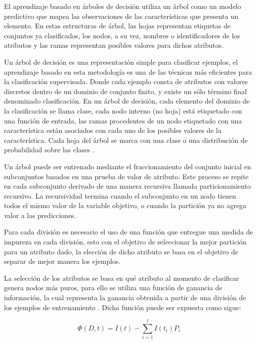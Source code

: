El aprendizaje basado en árboles de decisión utiliza un árbol como un modelo predictivo que mapea las observaciones de las características que presenta un elemento. En estas estructuras de árbol, las hojas representan etiquetas de conjuntos ya clasificados, los nodos, a su vez, nombres o identificadores de los atributos y las ramas representan posibles valores para dichos atributos.
 
Un árbol de decisión es una representación simple para clasificar ejemplos, el aprendizaje basado en esta metodología es una de las técnicas más eficientes para la clasificación supervisada. Donde cada ejemplo consta de atributos con valores discretos dentro de un dominio de conjunto finito, y existe un sólo término final denominado clasificación. En un árbol de decisión, cada elemento del dominio de la clasificación se llama clase, cada nodo interno (no hoja) está etiquetado con una función de entrada, las ramas procedentes de un nodo etiquetado con una característica están asociados con cada uno de los posibles valores de la característica. Cada hoja del árbol se marca con una clase o una distribución de probabilidad sobre las clases \cite{bhargava2013decision}.

Un árbol puede ser entrenado mediante el fraccionamiento del conjunto inicial en subconjuntos basados en una prueba de valor de atributo. Este proceso se repite en cada subconjunto derivado de una manera recursiva llamada particionamiento recursivo. La recursividad termina cuando el subconjunto en un nodo tienen todos el mismo valor de la variable objetivo, o cuando la partición ya no agrega valor a las predicciones.

Para cada división es necesario el uso de una función que entregue una medida de impureza en cada división, esto con el objetivo de seleccionar la mejor partición para un atributo dado, la elección de dicho atributo se basa en el objetivo de separar de mejor manera los ejemplos. 

La selección de los atributos se basa en qué atributo al momento de clasificar genera nodos más puros, para ello se utiliza una función de ganancia de información, la cual representa la ganancia  obtenida a partir de una división de los ejemplos de entrenamiento \cite{breiman2017classification}. Dicha función puede ser expuesta como sigue:

\begin{center}
	\begin{equation}
	\Phi(D,t) = I(t) - \sum_{i=1}^{l} I(t_{i})P_{i}
	\end{equation}
\end{center}

